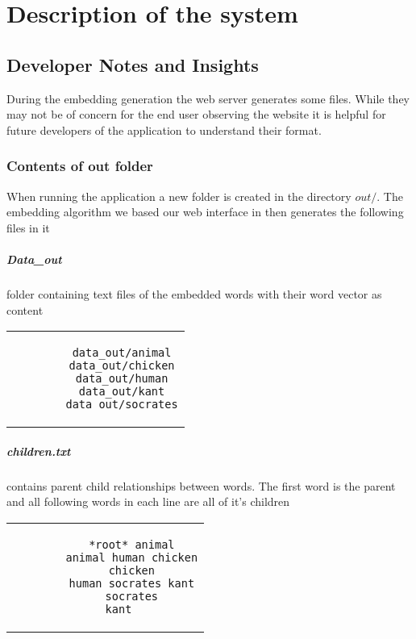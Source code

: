 \chapter{Description of the system}
\label{dev_notes}
\section{Developer Notes and Insights}
During the embedding generation the web server generates some files. While they may not be of concern for the end user observing the website it is helpful for future developers of the application to understand their format.

\subsection{Contents of out folder}
When running the application a new folder is created in the directory $out/$. The embedding algorithm we based our web interface in then generates the following files in it
\paragraph{Data\_out} folder containing text files of the embedded words with their word vector as content
\begin{center}
	
	\begin{tabular}{c}
		\begin{lstlisting}
		data_out/animal
		data_out/chicken
		data_out/human
		data_out/kant
		data_out/socrates
		\end{lstlisting}
	\end{tabular}
\end{center}

\paragraph{children.txt} contains parent child relationships between words. The first word is the parent and all following words in each line are all of it's children
\begin{center}
	\begin{tabular}{c}
		\begin{lstlisting}
		*root* animal
		animal human chicken
		chicken
		human socrates kant
		socrates
		kant	
		\end{lstlisting}
	\end{tabular}
\end{center}

